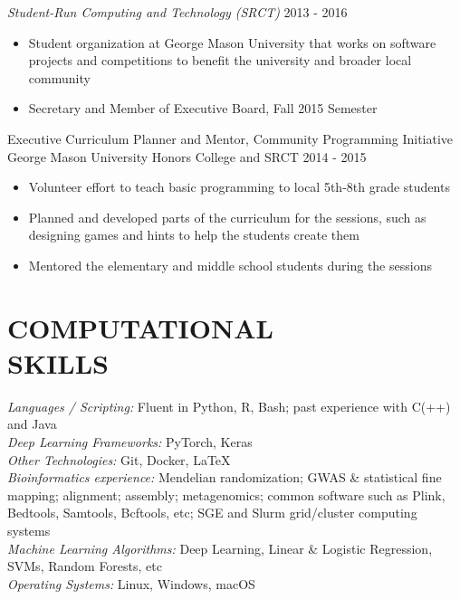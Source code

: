 \documentclass[margin, 10pt]{res} %
\begin{document}
\begin{resume}
{\sl Student-Run Computing and Technology (SRCT)} \hfill 2013 - 2016 \begin{itemize} \itemsep -2pt %
\item Student organization at George Mason University that works on software projects and competitions to benefit the university and broader local community
\item Secretary and Member of Executive Board, Fall 2015 Semester
\end{itemize}

Executive Curriculum Planner and Mentor, Community Programming Initiative \\ George Mason University Honors College and SRCT
 \hfill 2014 - 2015
\begin{itemize} \itemsep -2pt %
\item Volunteer effort to teach basic programming to local 5th-8th grade students
\item Planned and developed parts of the curriculum for the sessions, such as designing games and hints to help the students create them
\item Mentored the elementary and middle school students during the sessions
\end{itemize} 




\section{COMPUTATIONAL \\ SKILLS} 

{\sl Languages / Scripting:} 
Fluent in Python, R, Bash; past experience with C(++) and Java\\
{\sl Deep Learning Frameworks:} PyTorch, Keras \\
{\sl Other Technologies:} Git, Docker, LaTeX \\
{\sl Bioinformatics experience:} Mendelian randomization; GWAS \& statistical fine mapping; alignment; assembly; metagenomics; common software such as Plink, Bedtools, Samtools, Bcftools, etc; SGE and Slurm grid/cluster computing systems \\
{\sl Machine Learning Algorithms:} Deep Learning, Linear \& Logistic Regression, SVMs, Random Forests, etc \\
{\sl Operating Systems:} Linux, Windows, macOS 




\end{resume}
\end{document}
